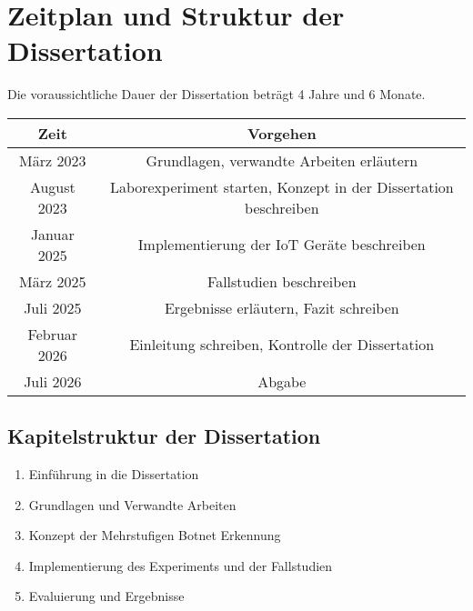 \section{Zeitplan und Struktur der Dissertation}
\label{sec:plan}

Die voraussichtliche Dauer der Dissertation beträgt 4 Jahre und 6 Monate.

\begin{center}
    \begin{tabular}[c]{| c | c |}
        \hline
        \rowcolor{lightgray} Zeit & Vorgehen \\ [0.5ex]
        \hline
        März 2023 & Grundlagen, verwandte Arbeiten erläutern \\
        \hline
        August 2023 &  Laborexperiment starten, Konzept in der Dissertation beschreiben \\
        \hline
        Januar 2025 & Implementierung der IoT Geräte beschreiben \\
        \hline
        März 2025 & Fallstudien beschreiben \\
        \hline
        Juli 2025 & Ergebnisse erläutern, Fazit schreiben \\
        \hline
        Februar 2026 & Einleitung schreiben, Kontrolle der Dissertation \\
        \hline
        Juli 2026 & Abgabe \\
        \hline
    \end{tabular}
\end{center}

\subsection*{Kapitelstruktur der Dissertation}

\begin{enumerate}[label=\Roman*]
    \item Einführung in die Dissertation
    \item Grundlagen und Verwandte Arbeiten
    \item Konzept der Mehrstufigen Botnet Erkennung
    \item Implementierung des Experiments und der Fallstudien
    \item Evaluierung und Ergebnisse
\end{enumerate}

